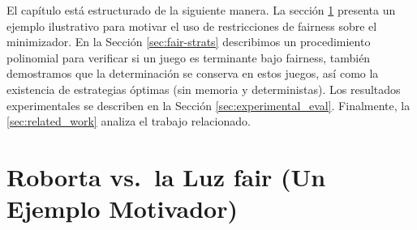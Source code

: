 

El capítulo está estructurado de la siguiente manera. La sección \ref{sec:mot_example} presenta un ejemplo ilustrativo para motivar el uso de restricciones de fairness sobre el minimizador.
En la Sección \ref{sec:fair-strats} describimos un procedimiento polinomial para verificar si un juego es terminante bajo fairness,
también demostramos que la determinación se conserva en estos juegos, así como la existencia de estrategias óptimas (sin memoria y deterministas).
Los resultados experimentales se describen en la Sección \ref{sec:experimental_eval}.
Finalmente, la \ref{sec:related_work} analiza el trabajo relacionado.




\newcommand{\roborta}{Roborta\xspace}

\section{\roborta vs.\ la Luz fair (Un Ejemplo Motivador)} \label{sec:mot_example}

